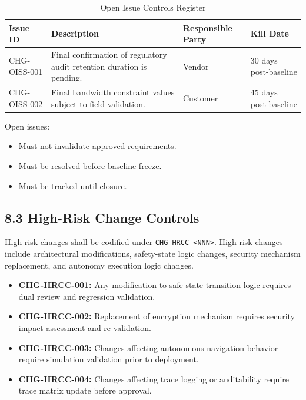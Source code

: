 \documentclass[11pt,a4paper]{article}
\begin{document}
\begin{table}[h]
\centering
\small
\renewcommand{\arraystretch}{1.2}
\begin{tabular}{|p{}|p{}|p{}|p{}|}
\hline
\rowcolor{tableheader}
\textbf{Issue ID} & \textbf{Description} & \textbf{Responsible Party} & \textbf{Kill Date} \\ \hline
CHG-OISS-001 & Final confirmation of regulatory audit retention duration is pending. & Vendor & 30 days post-baseline \\
\hline
CHG-OISS-002 & Final bandwidth constraint values subject to field validation. & Customer & 45 days post-baseline \\
\hline
\end{tabular}
\caption{Open Issue Controls Register}
\label{tab:open-issues}
\end{table}

Open issues:
\begin{itemize}[leftmargin=*,nosep]
  \item Must not invalidate approved requirements.
  \item Must be resolved before baseline freeze.
  \item Must be tracked until closure.
\end{itemize}

\subsection{8.3 High-Risk Change Controls}

High-risk changes shall be codified under \texttt{CHG-HRCC-<NNN>}. High-risk changes include architectural modifications, safety-state logic changes, security mechanism replacement, and autonomy execution logic changes.

\begin{itemize}[leftmargin=*]
  \item \textbf{CHG-HRCC-001:} Any modification to safe-state transition logic requires dual review and regression validation.
  \item \textbf{CHG-HRCC-002:} Replacement of encryption mechanism requires security impact assessment and re-validation.
  \item \textbf{CHG-HRCC-003:} Changes affecting autonomous navigation behavior require simulation validation prior to deployment.
  \item \textbf{CHG-HRCC-004:} Changes affecting trace logging or auditability require trace matrix update before approval.
\end{itemize}
\end{document}
